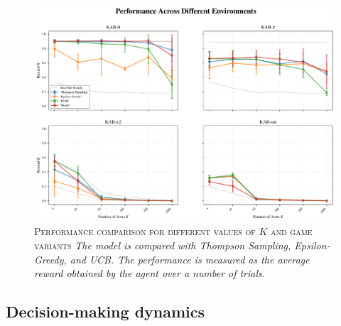 \begin{figure}[h]
    \centering
    \includegraphics[width=1.\textwidth]{figures/performance_plot.png}
    \caption{\textsc{Performance comparison for different values of $K$ and game variants} \textit{The model is compared with Thompson Sampling, Epsilon-Greedy, and UCB. The performance is measured as the average reward obtained by the agent over a number of trials.}}
    \label{fig:perf_plot}
\end{figure}


\subsection{Decision-making dynamics}

